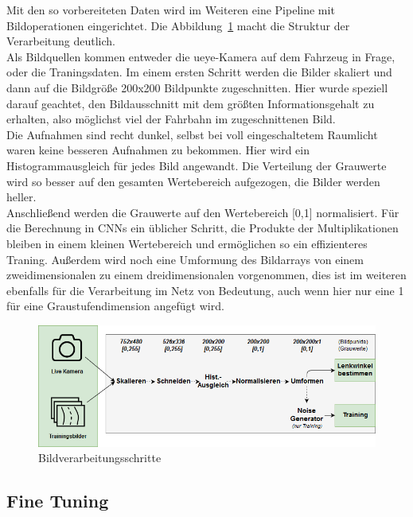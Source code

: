 Mit den so vorbereiteten Daten wird im Weiteren eine Pipeline mit Bildoperationen eingerichtet. Die Abbildung~\ref{fig:dronetfrozen} macht die Struktur der Verarbeitung deutlich.\\
Als Bildquellen kommen entweder die ueye-Kamera auf dem Fahrzeug in Frage, oder die Traningsdaten. Im einem ersten Schritt werden die Bilder skaliert und dann auf die Bildgröße 200x200 Bildpunkte zugeschnitten. Hier wurde speziell darauf geachtet, den Bildausschnitt mit dem größten Informationsgehalt zu erhalten, also möglichst viel der Fahrbahn im zugeschnittenen Bild.\\
Die Aufnahmen sind recht dunkel, selbst bei voll eingeschaltetem Raumlicht waren keine besseren Aufnahmen zu bekommen. Hier wird ein Histogrammausgleich für jedes Bild angewandt. Die Verteilung der Grauwerte wird so besser auf den gesamten Wertebereich aufgezogen, die Bilder werden heller.\\
Anschließend werden die Grauwerte auf den Wertebereich [0,1] normalisiert. Für die Berechnung in CNNs ein üblicher Schritt, die Produkte der Multiplikationen bleiben in einem kleinen Wertebereich und ermöglichen so ein effizienteres Traning. Außerdem wird noch eine Umformung des Bildarrays von einem zweidimensionalen zu einem dreidimensionalen vorgenommen, dies ist im weiteren ebenfalls für die Verarbeitung im Netz von Bedeutung, auch wenn hier nur eine 1 für eine Graustufendimension angefügt wird.

\begin{figure}[h]
	\centering
	\includegraphics[scale=0.56]{figures/Pipeline.png}
	\caption{Bildverarbeitungsschritte}
	\label{fig:dronetfrozen}
\end{figure}





\subsection{Fine Tuning}

